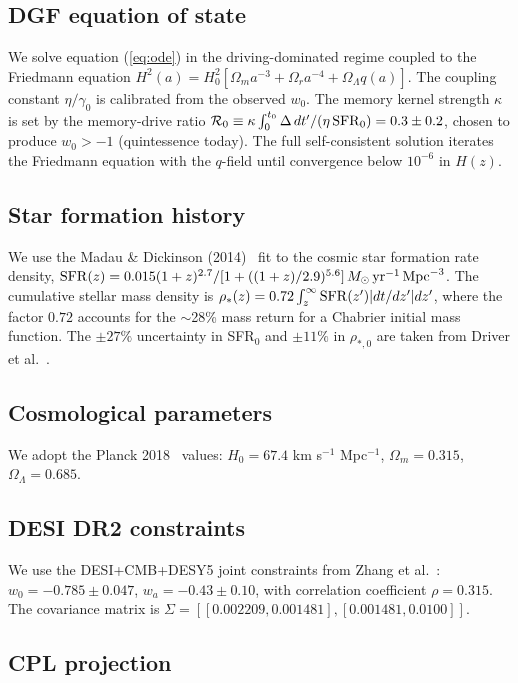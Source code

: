 \documentclass[12pt,a4paper]{article}
\begin{document}
\subsection*{DGF equation of state}

We solve equation (\ref{eq:ode}) in the driving-dominated regime coupled to the Friedmann equation $H^2(a)=H_0^2[\Omega_m a^{-3}+\Omega_r a^{-4}+\Omega_\Lambda q(a)]$. The coupling constant $\eta/\gamma_0$ is calibrated from the observed $w_0$. The memory kernel strength $\kappa$ is set by the memory-drive ratio $\mathcal{R}_0\equiv\kappa\int_0^{t_0}\Delta\,dt'/(\eta\,{\rm SFR}_0)=0.3\pm0.2$, chosen to produce $w_0>-1$ (quintessence today). The full self-consistent solution iterates the Friedmann equation with the $q$-field until convergence below $10^{-6}$ in $H(z)$.

\subsection*{Star formation history}

We use the Madau \& Dickinson (2014)~\cite{madau2014} fit to the cosmic star formation rate density, ${\rm SFR}(z)=0.015(1+z)^{2.7}/[1+((1+z)/2.9)^{5.6}]\,M_\odot\,{\rm yr}^{-1}\,{\rm Mpc}^{-3}$. The cumulative stellar mass density is $\rho_*(z)=0.72\int_z^\infty{\rm SFR}(z')|dt/dz'|dz'$, where the factor $0.72$ accounts for the $\sim$28\% mass return for a Chabrier initial mass function. The $\pm27\%$ uncertainty in SFR$_0$ and $\pm11\%$ in $\rho_{*,0}$ are taken from Driver et al.~\cite{driver2018}.

\subsection*{Cosmological parameters}

We adopt the Planck 2018~\cite{planck2018} values: $H_0=67.4$ km s$^{-1}$ Mpc$^{-1}$, $\Omega_m=0.315$, $\Omega_\Lambda=0.685$.

\subsection*{DESI DR2 constraints}

We use the DESI+CMB+DESY5 joint constraints from Zhang et al.~\cite{zhang2026}: $w_0=-0.785\pm0.047$, $w_a=-0.43\pm0.10$, with correlation coefficient $\rho=0.315$. The covariance matrix is $\Sigma=[[0.002209,0.001481],[0.001481,0.0100]]$.

\subsection*{CPL projection}
\end{document}
